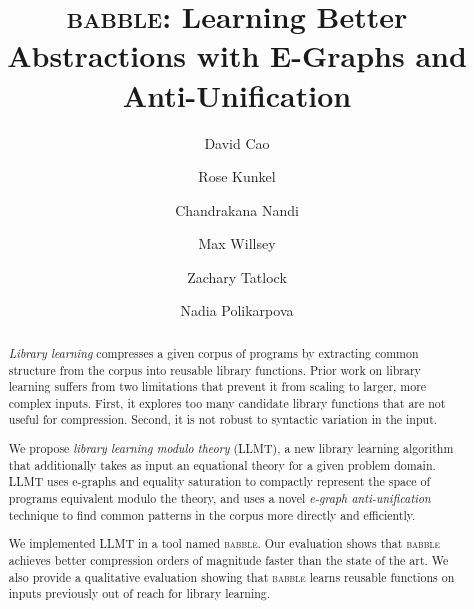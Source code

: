 \documentclass[acmsmall,screen,nonacm,review=false,timestamp=false]{acmart}
\newcommand{\tname}[1]{\textsc{#1}\xspace}
\newcommand{\tool}{\tname{babble}}
\begin{document}
\title{\tool: Learning Better Abstractions with E-Graphs and Anti-Unification}
\renewcommand{\shorttitle}{Learning Better Abstractions with E-Graphs and Anti-Unification}

\author{David Cao}

\author{Rose Kunkel}
\authornotemark[1]

\author{Chandrakana Nandi}

\author{Max Willsey}

\author{Zachary Tatlock}

\author{Nadia Polikarpova}

\renewcommand{\shortauthors}{Cao, D., Kunkel, R., Nandi, C., Willsey, M., Tatlock Z., Polikarpova, N.}

\begin{abstract}
\emph{Library learning}
  compresses a given corpus of programs
  by extracting common structure from
  the corpus into reusable library functions.
Prior work on library learning suffers from two limitations
 that prevent it from scaling to larger, more complex inputs.
First, it explores too many candidate library functions
  that are not useful for compression. 
Second, it is not robust to syntactic variation in
 the input.

We propose \emph{library learning modulo theory} (LLMT),
 a new library learning algorithm
 that additionally takes as input
 an equational theory for a given problem domain.
LLMT uses e-graphs and equality saturation
 to compactly represent the space of programs equivalent modulo the theory,
 and uses a novel \emph{e-graph anti-unification} technique
 to find common patterns in the corpus more directly and efficiently.

We implemented LLMT in a tool named \tool.
Our evaluation shows that \tool
 achieves better compression orders of magnitude faster
 than the state of the art.
We also provide a qualitative evaluation
 showing that \tool learns reusable functions
 on inputs previously out of reach for library learning.

\end{abstract}
 
\end{document}
